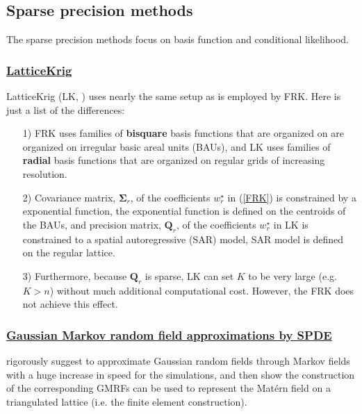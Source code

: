 \documentclass[
12pt, %
a4paper, %
oneside, %
headinclude,footinclude, %
BCOR5mm, %
]{scrartcl}
\begin{document}
\subsection{Sparse precision methods}
The sparse precision methods focus on basis function and conditional likelihood.

\subsubsection{\href{https://chenyw68.github.io/Literature/[2020]LatticeKrigVignette.pdf}{LatticeKrig}}
LatticeKrig (LK, \href{https://chenyw68.github.io/Literature/[2015]A Multiresolution Gaussian Process Model for the Analysis of Large Spatial Datasets.pdf}{\citep{nychka2015multiresolution}}) uses nearly the same setup as is employed by FRK. Here is just a list of the differences:
\begin{itemize}
 \item [1)] FRK uses families of \textbf{bisquare} basis functions that are organized on are organized on \textcolor[rgb]{0.50,0.50,0.50}{irregular} basic areal units (BAUs), and LK uses families of \textbf{radial} basis functions that are organized on \textcolor[rgb]{0.50,0.50,0.50}{regular} grids of increasing resolution.
 \item [2)] Covariance matrix, $\boldsymbol{\Sigma}_r$, of the coefficients $w_r^{\star}$ in (\ref{FRK}) is constrained by a exponential function, the exponential function is defined on the centroids of the BAUs, and precision matrix, $\boldsymbol{Q}_r$, of the coefficients $w_r^{\star}$ in LK is constrained to a spatial autoregressive (SAR) model, SAR model is defined on the regular lattice.
 \item [3)] Furthermore, because $\boldsymbol{Q}_r$ is sparse, LK can set $K$ to be very large (e.g. $K > n$) without much additional computational cost. However, the FRK does not achieve this effect.
\end{itemize}

\subsubsection{\href{http://www.r-inla.org/}{Gaussian Markov random field approximations by SPDE}}
\href{https://chenyw68.github.io/Literature/[2005]Gaussian markov random fields theory and applications.pdf}{\citet{rue2005gaussian}} rigorously suggest to approximate \textcolor[rgb]{0.50,0.50,0.50}{Gaussian random fields} through \textcolor[rgb]{0.50,0.50,0.50}{Markov fields} with a huge increase in speed for the simulations, and then \href{https://chenyw68.github.io/Literature/[2011]An explicit link between GF and GMRFs the SPDE approach.pdf}{\citet{lindgren2011explicit}} show the construction of the corresponding GMRFs can be used to represent the Matérn field on a triangulated lattice (i.e. the finite element construction). 
\end{document}

